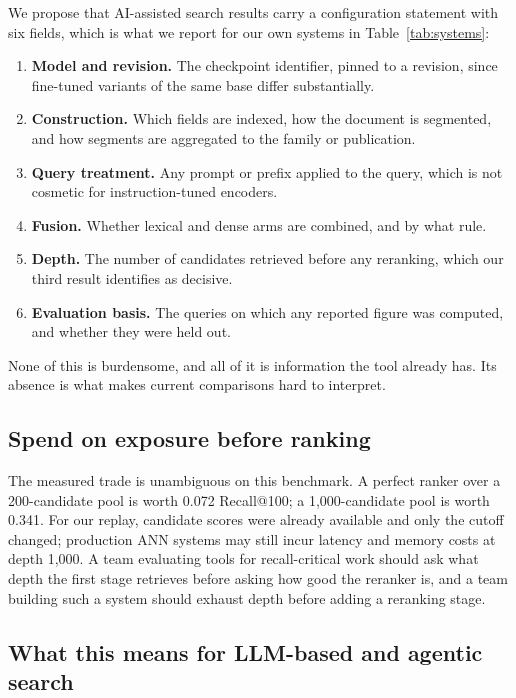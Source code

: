 \documentclass[preprint,11pt,authoryear]{elsarticle}          %
\begin{document}
We propose that AI-assisted search results carry a configuration statement with six fields, which is what we report for our own systems in Table~\ref{tab:systems}:

\begin{enumerate}
\item \textbf{Model and revision.} The checkpoint identifier, pinned to a revision, since fine-tuned variants of the same base differ substantially.
\item \textbf{Construction.} Which fields are indexed, how the document is segmented, and how segments are aggregated to the family or publication.
\item \textbf{Query treatment.} Any prompt or prefix applied to the query, which is not cosmetic for instruction-tuned encoders.
\item \textbf{Fusion.} Whether lexical and dense arms are combined, and by what rule.
\item \textbf{Depth.} The number of candidates retrieved before any reranking, which our third result identifies as decisive.
\item \textbf{Evaluation basis.} The queries on which any reported figure was computed, and whether they were held out.
\end{enumerate}

None of this is burdensome, and all of it is information the tool already has. Its absence is what makes current comparisons hard to interpret.

\subsection{Spend on exposure before ranking}

The measured trade is unambiguous on this benchmark. A perfect ranker over a 200-candidate pool is worth 0.072 Recall@100; a 1{,}000-candidate pool is worth 0.341. For our replay, candidate scores were already available and only the cutoff changed; production ANN systems may still incur latency and memory costs at depth 1{,}000. A team evaluating tools for recall-critical work should ask what depth the first stage retrieves before asking how good the reranker is, and a team building such a system should exhaust depth before adding a reranking stage.

\subsection{What this means for LLM-based and agentic search}
\end{document}
